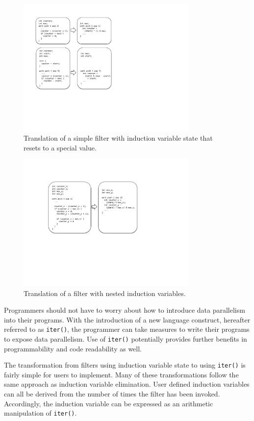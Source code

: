 \begin{figure}[t]
\includegraphics[width=3.5in]{figures/transformation2.pdf}
\caption{Translation of a simple filter with induction variable state that resets to a special value. \protect\label{fig:transform-after-start}}
\end{figure}

\begin{figure}[t]
\includegraphics[width=3.5in]{figures/transformation3.pdf}
\caption{Translation of a filter with nested induction variables. \protect\label{fig:transform-after-twonested}}
\end{figure}

Programmers should not have to worry about how to introduce data parallelism into their programs.  With the introduction of a new language construct, hereafter referred to as {\tt iter()}, the programmer can take measures to write their programs to expose data parallelism.  Use of {\tt iter()} potentially provides further benefits in programmability and code readability as well.

The transformation from filters using induction variable state to using {\tt iter()} is fairly simple for users to implement.  Many of these transformations follow the same approach as induction variable elimination.  User defined induction variables can all be derived from the number of times the filter has been invoked.  Accordingly, the induction variable can be expressed as an arithmetic manipulation of {\tt iter()}.  


